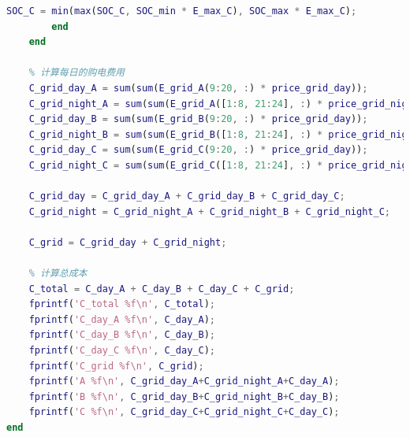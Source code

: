 \documentclass{cumcmthesis}
\begin{document}
\begin{appendices}
\begin{lstlisting}[language=Matlab]
            SOC_C = min(max(SOC_C, SOC_min * E_max_C), SOC_max * E_max_C);
        end
    end

    % 计算每日的购电费用
    C_grid_day_A = sum(sum(E_grid_A(9:20, :) * price_grid_day));
    C_grid_night_A = sum(sum(E_grid_A([1:8, 21:24], :) * price_grid_night));
    C_grid_day_B = sum(sum(E_grid_B(9:20, :) * price_grid_day));
    C_grid_night_B = sum(sum(E_grid_B([1:8, 21:24], :) * price_grid_night));
    C_grid_day_C = sum(sum(E_grid_C(9:20, :) * price_grid_day));
    C_grid_night_C = sum(sum(E_grid_C([1:8, 21:24], :) * price_grid_night));

    C_grid_day = C_grid_day_A + C_grid_day_B + C_grid_day_C;
    C_grid_night = C_grid_night_A + C_grid_night_B + C_grid_night_C;

    C_grid = C_grid_day + C_grid_night;

    % 计算总成本
    C_total = C_day_A + C_day_B + C_day_C + C_grid;
    fprintf('C_total %f\n', C_total);
    fprintf('C_day_A %f\n', C_day_A);
    fprintf('C_day_B %f\n', C_day_B);
    fprintf('C_day_C %f\n', C_day_C);
    fprintf('C_grid %f\n', C_grid);
    fprintf('A %f\n', C_grid_day_A+C_grid_night_A+C_day_A);
    fprintf('B %f\n', C_grid_day_B+C_grid_night_B+C_day_B);
    fprintf('C %f\n', C_grid_day_C+C_grid_night_C+C_day_C);
end

\end{lstlisting}
\end{appendices}
\end{document}
